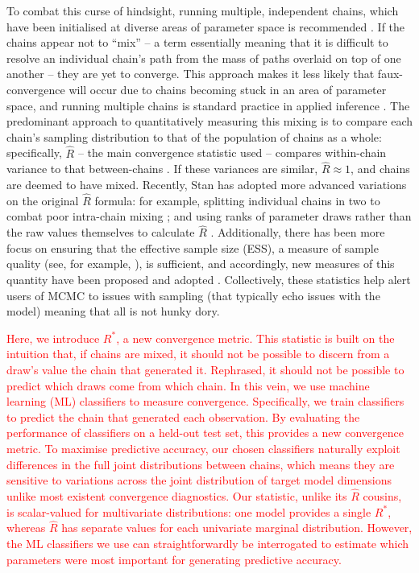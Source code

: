 \documentclass{article}
\begin{document}
To combat this curse of hindsight, running multiple, independent chains, which have been initialised at diverse areas of parameter space is recommended \citep{gelman1992inference}. If the chains appear not to ``mix'' -- a term essentially meaning that it is difficult to resolve an individual chain's path from the mass of paths overlaid on top of one another -- they are yet to converge. This approach makes it less likely that faux-convergence will occur due to chains becoming stuck in an area of parameter space, and running multiple chains is standard practice in applied inference \citep{lambert2018Student}. The predominant approach to quantitatively measuring this mixing is to compare each chain's sampling distribution to that of the population of chains as a whole: specifically, $\widehat{R}$ -- the main convergence statistic used -- compares within-chain variance to that between-chains \citep{gelman1992inference}. If these variances are similar, $\widehat{R}\approx 1$, and chains are deemed to have mixed. Recently, Stan has adopted more advanced variations on the original $\widehat{R}$ formula: for example, splitting individual chains in two to combat poor intra-chain mixing \citep{gelman2013bayesian}; and using ranks of parameter draws rather than the raw values themselves to calculate $\widehat{R}$ \citep{vehtari2019rank}. Additionally, there has been more focus on ensuring that the effective sample size (ESS), a measure of sample quality (see, for example, \cite{lambert2018Student}), is sufficient, and accordingly, new measures of this quantity have been proposed \citep{vehtari2019rank} and adopted \citep{carpenter2017stan}. Collectively, these statistics help alert users of MCMC to issues with sampling (that typically echo issues with the model) meaning that all is not hunky dory.

\textcolor{red}{Here, we introduce $R^*$, a new convergence metric. This statistic is built on the intuition that, if chains are mixed, it should not be possible to discern from a draw's value the chain that generated it. Rephrased, it should not be possible to predict which draws come from which chain. In this vein, we use machine learning (ML) classifiers to measure convergence. Specifically, we train classifiers to predict the chain that generated each observation. By evaluating the performance of classifiers on a held-out test set, this provides a new convergence metric. To maximise predictive accuracy, our chosen classifiers naturally exploit differences in the full joint distributions between chains, which means they are sensitive to variations across the joint distribution of target model dimensions unlike most existent convergence diagnostics. Our statistic, unlike its $\widehat{R}$ cousins, is scalar-valued for multivariate distributions: one model provides a single $R^*$, whereas $\widehat{R}$ has separate values for each univariate marginal distribution. However, the ML classifiers we use can straightforwardly be interrogated to estimate which parameters were most important for generating predictive accuracy.}
\end{document}
